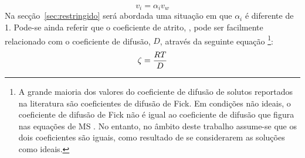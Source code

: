 \begin{equation}
 	\label{eq:alfa}
 	v_i=\alpha_i v_w
 \end{equation} 
Na secção~\ref{sec:restringido} será abordada uma situação em que $\alpha_i$ é diferente de 1. Pode-se ainda referir que o coeficiente de atrito, \atrito, pode ser facilmente relacionado com o coeficiente de difusão, $D$, através da seguinte equação \cite{wesslivro,taylor,krishna}
\footnote{A grande maioria dos valores do coeficiente de difusão de solutos reportados na literatura são coeficientes de difusão de Fick. Em condições não ideais, o coeficiente de difusão de Fick não é igual ao coeficiente de difusão que figura nas equações de MS \cite{wesslivro}. No entanto, no âmbito deste trabalho assume-se que os dois coeficientes são iguais, como resultado de se considerarem as soluções como ideais.}:
\begin{equation}
	\label{eq:DeA}
	\zeta=\frac{RT}{D}
\end{equation} 

